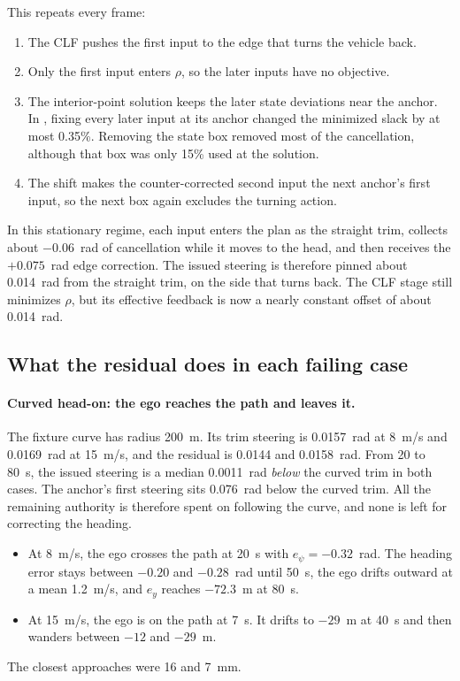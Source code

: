 \documentclass[11pt]{article}
\begin{document}
This repeats every frame:
\begin{enumerate}
\item The CLF pushes the first input to the edge that turns the vehicle back.
\item Only the first input enters $\rho$, so the later inputs have no objective.
\item The interior-point solution keeps the later state deviations near the
anchor. In , fixing every later
input at its anchor changed the minimized slack by at most 0.35\%. Removing the
state box removed most of the cancellation, although that box was only 15\%
used at the solution.
\item The shift makes the counter-corrected second input the next anchor's
first input, so the next box again excludes the turning action.
\end{enumerate}

In this stationary regime, each input enters the plan as the straight trim,
collects about $-0.06$~rad of cancellation while it moves to the head, and then receives the $+0.075$~rad edge
correction. The issued steering is therefore pinned about 0.014~rad from the
straight trim, on the side that turns back. The CLF stage still minimizes
$\rho$, but its effective feedback is now a nearly constant offset of about
0.014~rad.

\subsection{What the residual does in each failing case}
\paragraph{Curved head-on: the ego reaches the path and leaves it.} The fixture
curve has radius 200~m. Its trim steering is 0.0157~rad at 8~m/s and 0.0169~rad
at 15~m/s, and the residual is 0.0144 and 0.0158~rad. From 20 to 80~s, the issued
steering is a median 0.0011~rad \emph{below} the curved trim in both cases. The
anchor's first steering sits 0.076~rad below the curved trim. All the
remaining authority is therefore spent on following the curve, and none is
left for correcting the heading.
\begin{itemize}
\item At 8~m/s, the ego crosses the path at 20~s with $e_\psi=-0.32$~rad. The
heading error stays between $-0.20$ and $-0.28$~rad until 50~s, the ego drifts
outward at a mean 1.2~m/s, and $e_y$ reaches $-72.3$~m at 80~s.
\item At 15~m/s, the ego is on the path at 7~s. It drifts to $-29$~m at 40~s
and then wanders between $-12$ and $-29$~m.
\end{itemize}
The closest approaches were 16 and 7~mm.
\end{document}
